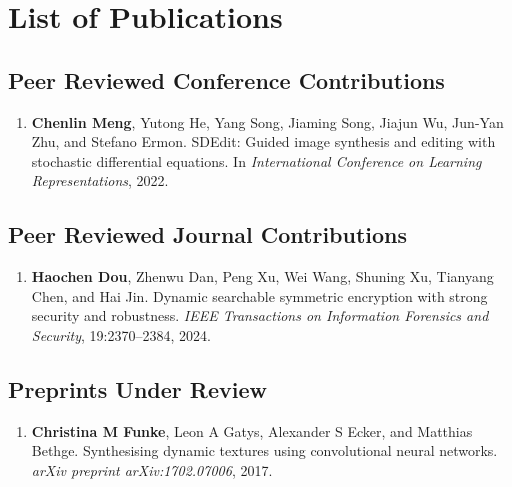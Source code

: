 \chapter{List of Publications}

\section*{Peer Reviewed Conference Contributions}
\begin{enumerate}
    \item \textbf{Chenlin Meng}, Yutong He, Yang Song, Jiaming Song, Jiajun Wu, Jun-Yan Zhu, and Stefano Ermon. SDEdit: Guided image synthesis and editing with stochastic differential equations. In \textit{International Conference on Learning Representations}, 2022.
\end{enumerate}
\nocite{meng2021sdedit}


\section*{Peer Reviewed Journal Contributions}
\begin{enumerate}
    \item \textbf{Haochen Dou}, Zhenwu Dan, Peng Xu, Wei Wang, Shuning Xu, Tianyang Chen, and Hai Jin. Dynamic searchable symmetric encryption with strong security and robustness. \textit{IEEE Transactions on Information Forensics and Security}, 19:2370–2384, 2024.
\end{enumerate}
\nocite{dou2024dynamic}


\section*{Preprints Under Review}
\begin{enumerate}
    \item \textbf{Christina M Funke}, Leon A Gatys, Alexander S Ecker, and Matthias Bethge. Synthesising dynamic textures using convolutional neural networks. \textit{arXiv preprint arXiv:1702.07006}, 2017.
\end{enumerate}
\nocite{funke2017synthesising}